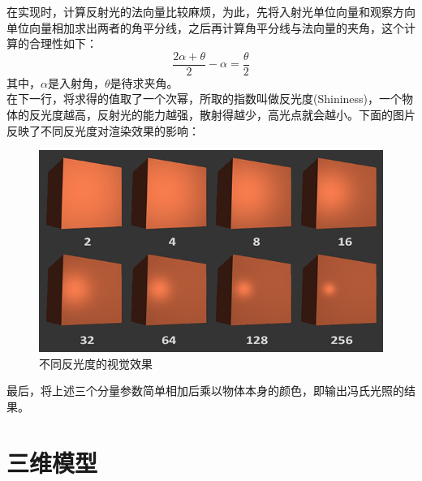 \begin{spacing}{2.5}
    在实现时，计算反射光的法向量比较麻烦，为此，先将入射光单位向量和观察方向单位向量相加求出两者的角平分线，之后再计算角平分线与法向量的夹角，这个计算的合理性如下：
   		\begin{equation}
   			\frac{2\alpha+\theta}{2} - \alpha = \frac{\theta}{2}
   		\end{equation}
    其中，$\alpha$是入射角，$\theta$是待求夹角。\\
    在下一行，将求得的值取了一个次幂，所取的指数叫做反光度(Shininess)，一个物体的反光度越高，反射光的能力越强，散射得越少，高光点就会越小。下面的图片反映了不同反光度对渲染效果的影响：
    
    \begin{figure}[H]
    	\centering
		\includegraphics[width=1.0\textwidth]{images/shininess.png}
		\caption{不同反光度的视觉效果}
		\label{shininess}
    \end{figure}
    
    最后，将上述三个分量参数简单相加后乘以物体本身的颜色，即输出冯氏光照的结果。
    	
    \end{spacing}
  

    \section{三维模型}

